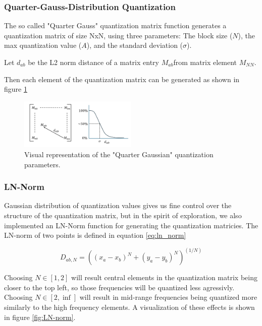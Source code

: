 \subsubsection{Quarter-Gauss-Distribution Quantization}

The so called "Quarter Gauss" quantization matrix function generates a quantization matrix of size NxN, using three parameters: The block size ($N$), the max quantization value ($A$), and the standard deviation ($\sigma$).

Let $d_{ab}$ be the L2 norm distance of a matrix entry $M_{ab}$from matrix element $M_{NN}$.

Then each element of the quantization matrix can be generated as shown in figure \ref{fig:gaussian_quant}

\begin{figure}
	\includegraphics[width=0.5\textwidth]{assets/Quarter Gauss Quantization.png}
	\caption{Visual representation of the "Quarter Gaussian" quantization parameters.}
	\label{fig:gaussian_quant}
\end{figure}

\subsubsection{LN-Norm}

Gaussian distribution of quantization values gives us fine control over the structure of the quantization matrix, but in the spirit of exploration, we also implemented an LN-Norm function for generating the quantization matricies.
The LN-norm of two points is defined in equation \ref{eq:ln_norm}

\begin{equation}
D_{ab, N} = ((x_a - x_b)^N + (y_a - y_b)^N)^{(1/N)}
\label{eq:ln_norm}
\end{equation}

Choosing $N\in[1,2]$ will result central elements in the quantization matrix being closer to the top left, so those frequencies will be quantized less agressivly. Choosing $N\in[2,\inf]$ will result in mid-range frequencies being quantized more similarly to the high frequency elements. 
A visualization of these effects is shown in figure \ref{fig:LN-norm}.

